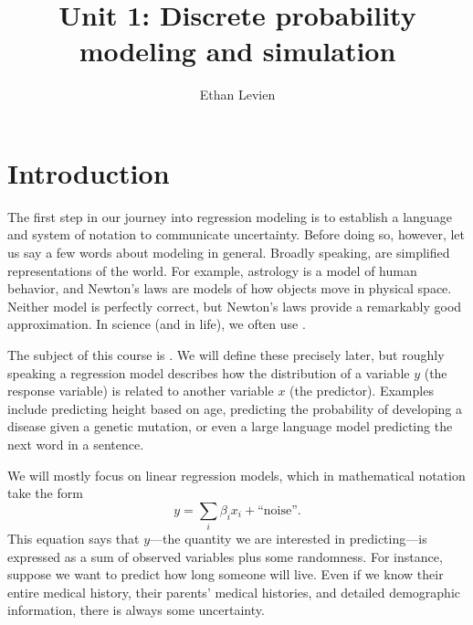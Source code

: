 
\setcounter{unit}{1}
\setcounter{section}{0}



\title{Unit 1: Discrete probability modeling and simulation}
\author{Ethan Levien}
\maketitle
\tableofcontents

\section*{Introduction}

The first step in our journey into regression modeling is to establish a language and system of notation to communicate uncertainty. Before doing so, however, let us say a few words about modeling in general. Broadly speaking,  are simplified representations of the world. For example, astrology is a model of human behavior, and Newton's laws are models of how objects move in physical space. Neither model is perfectly correct, but Newton's laws provide a remarkably good approximation. In science (and in life), we often use . 

The subject of this course is . We will define these precisely later, but roughly speaking a regression model describes how the distribution of a variable $y$ (the response variable) is related to another variable $x$ (the predictor). Examples include predicting height based on age, predicting the probability of developing a disease given a genetic mutation, or even a large language model predicting the next word in a sentence.

We will mostly focus on linear regression models, which in mathematical notation take the form 
\begin{equation}
y = \sum_{i} \beta_i x_i + \text{``noise''}.
\end{equation}
This equation says that $y$---the quantity we are interested in predicting---is expressed as a sum of observed variables plus some randomness. For instance, suppose we want to predict how long someone will live. Even if we know their entire medical history, their parents’ medical histories, and detailed demographic information, there is always some uncertainty. 



